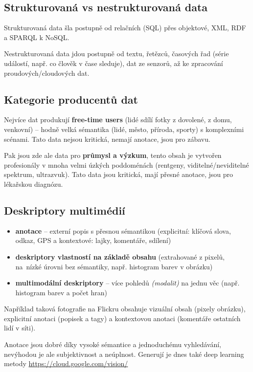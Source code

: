 \subsection{Strukturovaná vs nestrukturovaná data}

Strukturovaná data šla postupně od relačních (SQL) přes objektové, XML, RDF a SPARQL k NoSQL.

Nestrukturovaná data jdou postupně od textu, řetězců, časových řad (série událostí, např. co člověk v čase sleduje), dat ze senzorů, až ke zpracování proudových/cloudových dat.

\subsection{Kategorie producentů dat}

Nejvíce dat produkují \textbf{free-time users} (lidé sdílí fotky z dovolené, z domu, venkovní) -- hodně velká sémantika (lidé, město, příroda, sporty) s komplexními scénami. Tato data nejsou kritická, nemají anotace, jsou pro zábavu.

Pak jsou zde ale data pro \textbf{průmysl a výzkum}, tento obsah je vytvořen profesionály v mnoha velmi úzkých poddoménách (rentgeny, viditelné/neviditelné spektrum, ultrazvuk). Tato data jsou kritická, mají přesné anotace, jsou pro lékařskou diagnózu.

\subsection{Deskriptory multimédií}

\begin{itemize}
    \item \textbf{anotace} -- externí popis s přesnou sémantikou (explicitní: klíčová slova, odkaz, GPS a kontextové: lajky, komentáře, sdílení)
    \item \textbf{deskriptory vlastností na základě obsahu} (extrahované z pixelů, na~nízké úrovni bez sémantiky, např. histogram barev v obrázku)
    \item \textbf{multimodální deskriptory} -- více pohledů \textit{(modalit)} na jednu věc (např. histogram barev a počet hran)
\end{itemize}

Například taková fotografie na Flickru obsahuje vizuální obsah (pixely obráz\-ku), explicitní anotaci (popisek a tagy) a kontextovou anotaci (komentáře ostatních lidí v síti).

Anotace jsou dobré díky vysoké sémantice a jednoduchému vyhledávání, nevýhodou je ale subjektivnost a neúplnost. Generují je dnes také deep learning metody \url{https://cloud.google.com/vision/}

